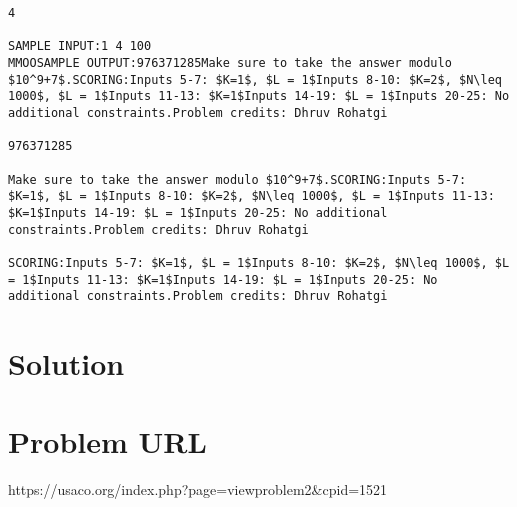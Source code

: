 \documentclass[12pt]{article}
\begin{document}
\begin{verbatim}
4

SAMPLE INPUT:1 4 100
MMOOSAMPLE OUTPUT:976371285Make sure to take the answer modulo $10^9+7$.SCORING:Inputs 5-7: $K=1$, $L = 1$Inputs 8-10: $K=2$, $N\leq 1000$, $L = 1$Inputs 11-13: $K=1$Inputs 14-19: $L = 1$Inputs 20-25: No additional constraints.Problem credits: Dhruv Rohatgi

976371285

Make sure to take the answer modulo $10^9+7$.SCORING:Inputs 5-7: $K=1$, $L = 1$Inputs 8-10: $K=2$, $N\leq 1000$, $L = 1$Inputs 11-13: $K=1$Inputs 14-19: $L = 1$Inputs 20-25: No additional constraints.Problem credits: Dhruv Rohatgi

SCORING:Inputs 5-7: $K=1$, $L = 1$Inputs 8-10: $K=2$, $N\leq 1000$, $L = 1$Inputs 11-13: $K=1$Inputs 14-19: $L = 1$Inputs 20-25: No additional constraints.Problem credits: Dhruv Rohatgi
\end{verbatim}

\section*{Solution}


\section*{Problem URL}
https://usaco.org/index.php?page=viewproblem2&cpid=1521
\end{document}
